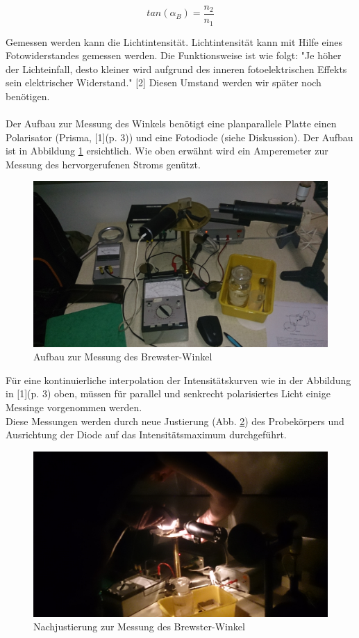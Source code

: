 \documentclass[12pt,a4paper]{article}
\begin{document}
\begin{multicols}{2}
$$tan(\alpha_B) = \frac{n_2}{n_1}$$

\noindent
Gemessen werden kann die Lichtintensität. Lichtintensität kann mit Hilfe eines Fotowiderstandes gemessen werden. Die Funktionsweise ist wie folgt: "Je höher der Lichteinfall, desto kleiner wird aufgrund des inneren fotoelektrischen Effekts sein elektrischer Widerstand." [2] Diesen Umstand werden wir später noch benötigen.\\
\\
Der Aufbau zur Messung des Winkels benötigt eine planparallele Platte einen Polarisator (Prisma, [1](p. 3)) und eine Fotodiode (siehe Diskussion). Der Aufbau ist in Abbildung \ref{fig:brewster_aufbau} ersichtlich. Wie oben erwähnt wird ein Amperemeter zur Messung des hervorgerufenen Stroms genützt.

\begin{figure}[H]
	\centering
	\includegraphics[scale=0.055]{./data/PS5_1_Aufbau.jpg}
	\caption{Aufbau zur Messung des Brewster-Winkel}
	\label{fig:brewster_aufbau}
\end{figure}
\noindent
Für eine kontinuierliche interpolation der Intensitätskurven wie in der Abbildung in [1](p. 3) oben, müssen für parallel und senkrecht polarisiertes Licht einige Messinge vorgenommen werden.\\
Diese Messungen werden durch neue Justierung (Abb. \ref{fig:brewster_justierung}) des Probekörpers und Ausrichtung der Diode auf das Intensitätsmaximum durchgeführt.

\begin{figure}[H]
	\centering
	\includegraphics[scale=0.055]{./data/PS5_1_Justierung.jpg}
	\caption{Nachjustierung zur Messung des Brewster-Winkel}
	\label{fig:brewster_justierung}
\end{figure}



\end{multicols}
\end{document}
